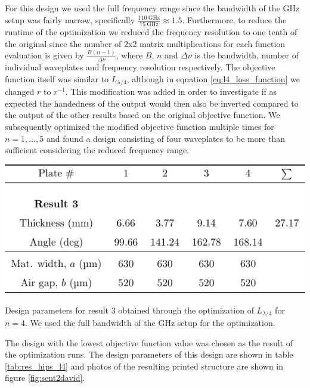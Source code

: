 For this design we used the full frequency range since the bandwidth of the GHz setup was fairly narrow, specifically $\frac{\SI{110}{\giga \hertz}}{\SI{75}{\giga \hertz}} \approx 1.5$. Furthermore, to reduce the runtime of the optimization we reduced the frequency resolution to one tenth of the original since the number of 2x2 matrix multiplications for each function evaluation is given by $\frac{B(n-1)}{\Delta \nu}$, where $B$, $n$ and $\Delta \nu$ is the bandwidth, number of individual waveplates and frequency resolution respectively. The objective function itself was similar to $L_{\lambda/4}$, although in equation \ref{eq:l4_loss_function} we changed $r$ to $r^{-1}$. This modification was added in order to investigate if as expected the handedness of the output would then also be inverted compared to the output of the other results based on the original objective function. We subsequently optimized the modified objective function multiple times for $n=1, ..., 5$ and found a design consisting of four waveplates to be more than sufficient considering the reduced frequency range. 

\begin{table}[ht]
    \centering
    \includegraphics[scale=1.0]{images/results/polymer_result_table.pdf}
    \caption{Design parameters for result 3 obtained through the optimization of $L_{\lambda/4}$ for $n=4$. We used the full bandwidth of the GHz setup for the optimization.}
    \label{tab:res_hips_l4}
\end{table}

The design with the lowest objective function value was chosen as the result of the optimization runs. The design parameters of this design are shown in table \ref{tab:res_hips_l4} and photos of the resulting printed structure are shown in figure \ref{fig:sent2david}.

